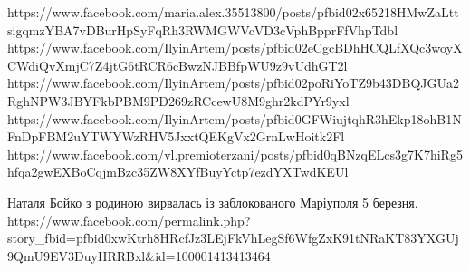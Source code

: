  
 
 
 
 

https://www.facebook.com/maria.alex.35513800/posts/pfbid02x65218HMwZaLttsigqmzYBA7vDBurHpSyFqRh3RWMGWVcVD3cVphBpprFfVhpTdbl
https://www.facebook.com/IlyinArtem/posts/pfbid02eCgcBDhHCQLfXQc3woyXCWdiQvXmjC7Z4jtG6tRCR6cBwzNJBBfpWU9z9vUdhGT2l
https://www.facebook.com/IlyinArtem/posts/pfbid02poRiYoTZ9b43DBQJGUa2RghNPW3JBYFkbPBM9PD269zRCcewU8M9ghr2kdPYr9yxl
https://www.facebook.com/IlyinArtem/posts/pfbid0GFWiujtqhR3hEkp18ohB1NFnDpFBM2uYTWYWzRHV5JxxtQEKgVx2GrnLwHoitk2Fl
https://www.facebook.com/vl.premioterzani/posts/pfbid0qBNzqELcs3g7K7hiRg5hfqa2gwEXBoCqjmBzc35ZW8XYfBuyYctp7ezdYXTwdKEUl

Наталя Бойко з родиною вирвалась із заблокованого Маріуполя 5 березня.
https://www.facebook.com/permalink.php?story_fbid=pfbid0xwKtrh8HRcfJz3LEjFkVhLegSf6WfgZxK91tNRaKT83YXGUj9QmU9EV3DuyHRRBxl&id=100001413413464
